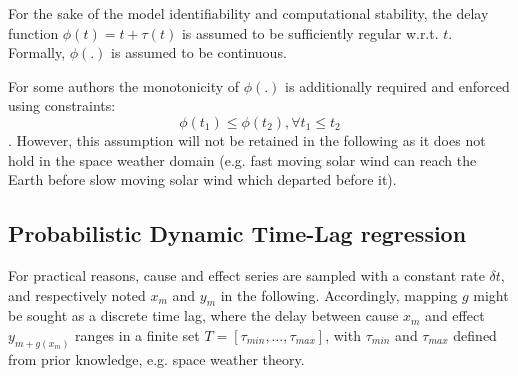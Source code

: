 For the sake of the model identifiability and computational stability, the delay function 
$\phi(t) = t + \tau(t)$ is assumed to be sufficiently regular w.r.t. $t$. Formally, $\phi(.)$ is assumed 
to be continuous. %

For some authors  \citep{ZHOU2006195} the monotonicity of $\phi(.)$ is additionally required and enforced 
using constraints:   $$\phi(t_1) \leq \phi(t_2), \forall t_1 \leq t_2$$. However, this assumption will not 
be retained in the following as it does not hold in the space weather domain (e.g. fast moving solar wind 
can reach the Earth before slow moving solar wind which departed before it). 

\subsection{Probabilistic Dynamic Time-Lag regression}

For practical reasons, cause and effect series are sampled with a constant rate $\delta t$, and respectively 
noted ${x_m}$ and ${y_m}$ in the following. Accordingly, mapping $g$ might be sought as a discrete time lag, 
where the delay between cause $x_m$ and effect $y_{m+g(x_m)}$ ranges in a finite set 
$T = [\tau_{min}, \ldots, \tau_{max}]$, with  $\tau_{min}$ and  $\tau_{max}$ defined from prior knowledge, 
e.g. space weather theory. 

